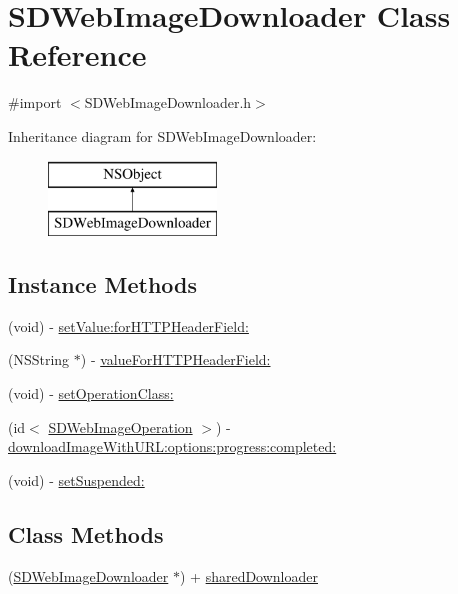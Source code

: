 \hypertarget{interface_s_d_web_image_downloader}{}\section{S\+D\+Web\+Image\+Downloader Class Reference}
\label{interface_s_d_web_image_downloader}


{\ttfamily \#import $<$S\+D\+Web\+Image\+Downloader.\+h$>$}

Inheritance diagram for S\+D\+Web\+Image\+Downloader\+:\begin{figure}[H]
\begin{center}
\leavevmode
\includegraphics[height=2.000000cm]{interface_s_d_web_image_downloader}
\end{center}
\end{figure}
\subsection*{Instance Methods}
\begin{DoxyCompactItemize}
\item 
(void) -\/ \hyperlink{interface_s_d_web_image_downloader_a4705bbfc9ce6a39b8a72c7400451adbd}{set\+Value\+:for\+H\+T\+T\+P\+Header\+Field\+:}
\item 
(N\+S\+String $\ast$) -\/ \hyperlink{interface_s_d_web_image_downloader_a35c47c9cf43fbce253153417f5f9f2f4}{value\+For\+H\+T\+T\+P\+Header\+Field\+:}
\item 
(void) -\/ \hyperlink{interface_s_d_web_image_downloader_a27a55eb9ae3c7b1c9f3a2617420390e9}{set\+Operation\+Class\+:}
\item 
(id$<$ \hyperlink{protocol_s_d_web_image_operation-p}{S\+D\+Web\+Image\+Operation} $>$) -\/ \hyperlink{interface_s_d_web_image_downloader_ac60cbbe2cfeb0ca230fa3e04e5f94015}{download\+Image\+With\+U\+R\+L\+:options\+:progress\+:completed\+:}
\item 
(void) -\/ \hyperlink{interface_s_d_web_image_downloader_aa477f2fb00e135fbaa7cef40111feb06}{set\+Suspended\+:}
\end{DoxyCompactItemize}
\subsection*{Class Methods}
\begin{DoxyCompactItemize}
\item 
(\hyperlink{interface_s_d_web_image_downloader}{S\+D\+Web\+Image\+Downloader} $\ast$) + \hyperlink{interface_s_d_web_image_downloader_a3611251a4eebd50128610c79d48aadca}{shared\+Downloader}
\end{DoxyCompactItemize}
